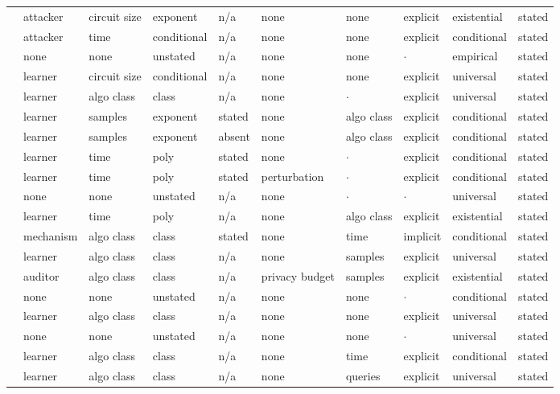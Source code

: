 \begin{landscape}
\begin{longtable}{rlllllllll}
\cite{BC22} & attacker & circuit size & exponent & n/a & none & none & explicit & existential & stated \\
\cite{AHY25} & attacker & time & conditional & n/a & none & none & explicit & conditional & stated \\
\cite{SHMWGWS26} & none & none & unstated & n/a & none & none & $\cdot$ & empirical & stated \\
\cite{GJW22a} & learner & circuit size & conditional & n/a & none & none & explicit & universal & stated \\
\cite{GJW22b} & learner & algo class & class & n/a & none & $\cdot$ & explicit & universal & stated \\
\cite{DPLB24} & learner & samples & exponent & stated & none & algo class & explicit & conditional & stated \\
\cite{DLB25} & learner & samples & exponent & absent & none & algo class & explicit & conditional & stated \\
\cite{LZZ24} & learner & time & poly & stated & none & $\cdot$ & explicit & conditional & stated \\
\cite{SZB21} & learner & time & poly & stated & perturbation & $\cdot$ & explicit & conditional & stated \\
\cite{HS24} & none & none & unstated & n/a & none & $\cdot$ & $\cdot$ & universal & stated \\
\cite{HW21} & learner & time & poly & n/a & none & algo class & explicit & existential & stated \\
\cite{YHGA25} & mechanism & algo class & class & stated & none & time & implicit & conditional & stated \\
\cite{AGJ21} & learner & algo class & class & n/a & none & samples & explicit & universal & stated \\
\cite{DM22} & auditor & algo class & class & n/a & privacy budget & samples & explicit & existential & stated \\
\cite{BLMST22} & none & none & unstated & n/a & none & none & $\cdot$ & conditional & stated \\
\cite{EGV25} & learner & algo class & class & n/a & none & none & explicit & universal & stated \\
\cite{SKMTO26} & none & none & unstated & n/a & none & none & $\cdot$ & universal & stated \\
\cite{ABM23} & learner & algo class & class & n/a & none & time & explicit & conditional & stated \\
\cite{DGKP19} & learner & algo class & class & n/a & none & queries & explicit & universal & stated \\

\end{longtable}
\end{landscape}
